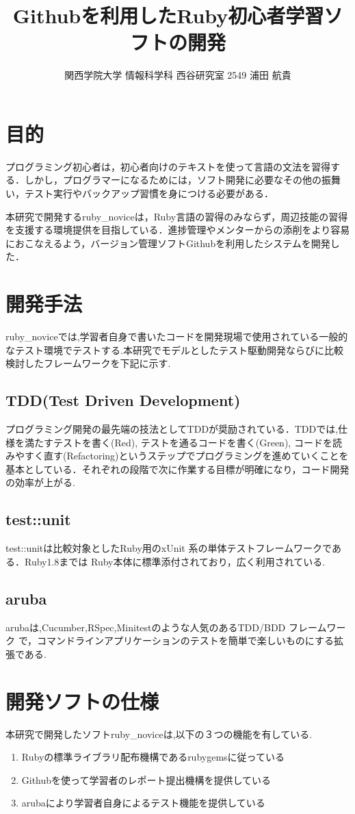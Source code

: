 \documentclass[10pt,a4j,twocolumn]{jsarticle}
\begin{document}
\title{Githubを利用したRuby初心者学習ソフトの開発}
\author{関西学院大学 情報科学科 西谷研究室 2549 浦田 航貴}
\date{}
\maketitle
\section{目的}
プログラミング初心者は，初心者向けのテキストを使って言語の文法を習得する．しかし，プログラマーになるためには，ソフト開発に必要なその他の振舞い，テスト実行やバックアップ習慣を身につける必要がある．

本研究で開発するruby\_noviceは，Ruby言語の習得のみならず，周辺技能の習得を支援する環境提供を目指している．進捗管理やメンターからの添削をより容易におこなえるよう，バージョン管理ソフトGithubを利用したシステムを開発した．

\section{開発手法}
ruby\_noviceでは,学習者自身で書いたコードを開発現場で使用されている一般的なテスト環境でテストする.本研究でモデルとしたテスト駆動開発ならびに比較検討したフレームワークを下記に示す.
\subsection{TDD(Test Driven Development)}
プログラミング開発の最先端の技法としてTDDが奨励されている．TDDでは,仕様を満たすテストを書く(Red), テストを通るコードを書く(Green), コードを読みやすく直す(Refactoring)というステップでプログラミングを進めていくことを基本としている．それぞれの段階で次に作業する目標が明確になり，コード開発の効率が上がる.
\subsection{test::unit}
test::unitは比較対象としたRuby用のxUnit 系の単体テストフレームワークである．Ruby1.8までは Ruby本体に標準添付されており，広く利用されている.
\subsection{aruba}
arubaは,Cucumber,RSpec,Minitestのような人気のあるTDD/BDD フレームワーク
で，コマンドラインアプリケーションのテストを簡単で楽しいものにする拡張である\cite{aruba}.

\section{開発ソフトの仕様}
本研究で開発したソフトruby\_noviceは,以下の３つの機能を有している.
\begin{enumerate}
\item Rubyの標準ライブラリ配布機構であるrubygemsに従っている
\item Githubを使って学習者のレポート提出機構を提供している
\item arubaにより学習者自身によるテスト機能を提供している
\end{enumerate}
\end{document}
